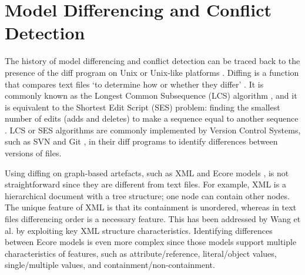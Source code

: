 \section{Model Differencing and Conflict Detection}
\label{sec:model_differencing_and_conflict_detection} 
The history of model differencing and conflict detection can be traced back to the presence of the \textsf{diff} program on Unix or Unix-like platforms \cite{hunt1976algorithm}. Diffing is a function that compares text files ‘to determine how or whether they differ’ \cite{diff}. It is commonly known as the Longest Common Subsequence (LCS) algorithm \cite{bergroth2000lcs}, and it is equivalent to the Shortest Edit Script (SES) problem: finding the smallest number of edits (adds and deletes) to make a sequence equal to another sequence \cite{DBLP:journals/algorithmica/Meyers86}. LCS or SES algorithms are commonly implemented by Version Control Systems, such as SVN \cite{svn-diff} and Git \cite{git-diff}, in their \textsf{diff} programs to identify differences between versions of files.

Using diffing on graph-based artefacts, such as XML \cite{w3c-xml} and Ecore models \cite{steinberg2008emf}, is not straightforward since they are different from text files. For example, XML is a hierarchical document with a tree structure; one node can contain other nodes. The unique feature of XML is that its containment is unordered, whereas in text files differencing order is a necessary feature. This has been addressed by Wang et al. \cite{wang2003xdiff} by exploiting key XML structure characteristics. Identifying differences between Ecore models is even more complex since those models support multiple characteristics of features, such as attribute/reference, literal/object values, single/multiple values, and containment/non-containment\cite{steinberg2008emf}.

